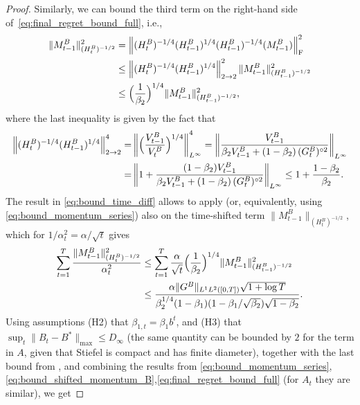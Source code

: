 \documentclass[11pt,a4paper]{article}
\numberwithin{equation}{section}
\theoremstyle{plain}
\theoremstyle{definition}
\theoremstyle{remark}
\begin{document}
\begin{proof}
    Similarly, we can bound the third term on the right-hand side of~\eqref{eq:final_regret_bound_full}, i.e.,
    \begin{align}\label{eq:bound_time_diff}
        \| M_{t-1}^B \|_{(H_t^B)^{-1/2}}^2 &= \left\|(H_t^B)^{-1/4}(H_{t-1}^B)^{1/4}(H_{t-1}^B)^{-1/4}(M_{t-1}^B) \right\|_{\mathrm{F}}^2 \nonumber \\
        & \leq \left\|(H_t^B)^{-1/4}(H_{t-1}^B)^{1/4} \right\|_{2 \to 2}^{2} \|M_{t-1}^B \|_{(H_{t-1}^B)^{-1/2}}^2 \nonumber \\
        & \leq \Bigl(\frac{1}{\beta_2}\Bigr)^{1/4} \|M_{t-1}^B \|_{(H_{t-1}^B)^{-1/2}}^2,
    \end{align}
    where the last inequality is given by the fact that 
    \begin{align*}
        \left\| (H_t^B)^{-1/4}(H_{t-1}^B)^{1/4} \right\|_{2 \to 2}^4 =& \left\| \Bigl(\frac{V_{t-1}^B}{V_t^B}\Bigr)^{1/4} \right\|_{L^{\infty}}^4 = \left\| \frac{V_{t-1}^B}{\beta_2 V_{t-1}^B + (1-\beta_2)\, (G_t^B)^{\circ 2}} \right\|_{L^{\infty}} \\
        =& \nonumber\left\| 1+\frac{(1-\beta_2)V_{t-1}^B}{\beta_2 V_{t-1}^B + (1-\beta_2) \, (G_t^B)^{\circ 2}} \right\|_{L^{\infty}} \leq 1+ \frac{1-\beta_2}{\beta_2}.
    \end{align*}
    The result in \eqref{eq:bound_time_diff} allows to apply \citep[Lemma 2]{convergence_adam_beyond} (or, equivalently, using \eqref{eq:bound_momentum_series}) also on the time-shifted term $\|M_{t-1}^B \|_{(H_{t}^B)^{-1/2}}$, which for $1/\alpha_t^2 =\alpha/\sqrt{t}$ gives
    \begin{align}\label{eq:bound_shifted_momentum_B}
        \sum_{t=1}^T \frac{\|M_{t-1}^B \|_{(H_{t}^B)^{-1/2}}^2}{\alpha_t^2} &\leq \sum_{t=1}^T \frac{\alpha}{\sqrt t}\Bigl(\frac{1}{\beta_2}\Bigr)^{1/4}\|M_{t-1}^B \|_{(H_{t-1}^B)^{-1/2}}^2 \nonumber \\
        &\leq \frac{\alpha \|G^B \|_{L^1L^2([0,T])} \sqrt{1+\log T}}{\beta_2^{1/4}(1-\beta_1)(1-\beta_1/\sqrt{\beta_2})\sqrt{1-\beta_2}}.
    \end{align}
    Using assumptions (H2) that $ \beta_{1,t} = \beta_1 b^t $, and (H3) that $\sup_{t} \|B_t -B^*\|_{\max} \leq D_{\infty}$ (the same quantity can be bounded by $2$ for the term in $A$, given that Stiefel is compact and has finite diameter), together with the last bound from \citep[Theorem 4]{convergence_adam_beyond}, and combining the results from \eqref{eq:bound_momentum_series}, \eqref{eq:bound_shifted_momentum_B},\eqref{eq:final_regret_bound_full} (for $A_t$ they are similar), we get

\end{proof}
\end{document}
